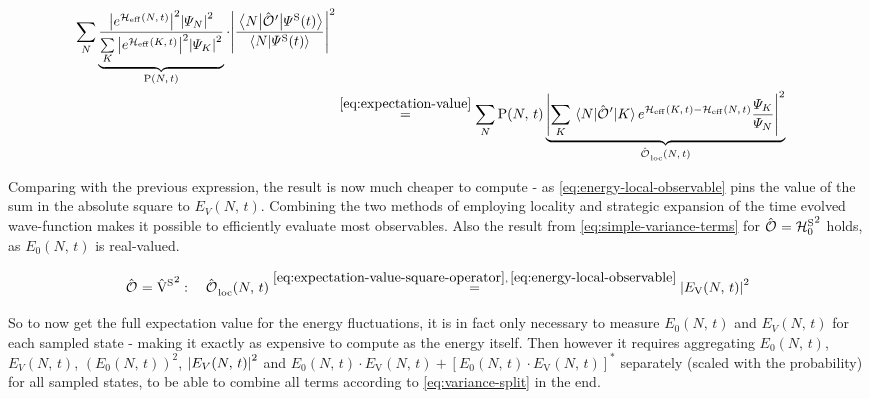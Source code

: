 \begin{equation}
\begin{split}
        \lsum[N]
        \underbrace{\frac{
            \absSquare{e^{\HeffOft}} \absSquare{\psiN} 
        }{
            \lsum[K] \absSquare{e^{\HeffOft[K]}} \absSquare{\psiN[K]} 
        }}_{\probabilityOf{N}{t}} \cdot 
        \absSquare{\frac{\bracketHelper{N}{{\ObservableOp{}'}}{\psiOfT[\schroedingerPicture]}}{\braketHelper{N}{\psiOfT[\schroedingerPicture]}}}\\
        &\stackrel{\ref{eq:expectation-value}}{=} \lsum[N]
        \probabilityOf{N}{t}
        \underbrace{\absSquare{\lsum[K] \bracketHelper{N}{{\ObservableOp{}'}}{K} e^{\HeffOft[K]-\HeffOft[N]}
        \frac{
            \psiN[K]
        }{
            \psiN[N]
        }}}_{\localObservable{N}{t}}
    \end{split}
\end{equation}

Comparing with the previous expression, the result is now much cheaper to compute - as \autoref{eq:energy-local-observable} pins the value of the sum in the absolute square to $E_V(N,\,t)$.
Combining the two methods of employing locality and strategic expansion of the time evolved wave-function makes it possible to efficiently evaluate most observables.
Also the result from \autoref{eq:simple-variance-terms} for $\ObservableOp = {\HzeroHamiltonian[\schroedingerPicture]}^2$ holds, as $E_0(N,\,t)$ is real-valued.

\begin{equation}
    \label{eq:v-squared-variance-last-term}
        \ObservableOp ={\Vhamiltonian[\schroedingerPicture]}^2: \quad \localObservable{N}{t} \stackrel{\ref{eq:expectation-value-square-operator},\,\ref{eq:energy-local-observable}}{=}
        \absSquare{E_\text{V}(N,\,t)}
\end{equation}

So to now get the full expectation value for the energy fluctuations, it is in fact only necessary to measure $E_0(N,\,t)$ and $E_V(N,\,t)$ for each sampled state - making it exactly as expensive to compute as the energy itself.
Then however it requires aggregating $E_0(N,\,t)$, $E_V(N,\,t)$, $\left(E_0(N,\,t)\right)^2$, $\absSquare{E_V(N,\,t)}$ and $E_0(N,\,t) \cdot E_\text{V}(N,\,t) + \left[E_0(N,\,t) \cdot E_\text{V}(N,\,t) \right]^\ast$ separately (scaled with the probability) for all sampled states, to be able to combine all terms according to \autoref{eq:variance-split} in the end.